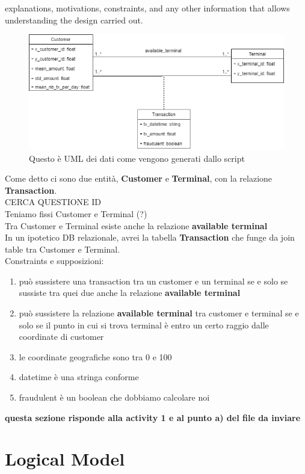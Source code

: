 \documentclass[letterpaper,11pt]{article}
\begin{document}
explanations, motivations, constraints, and any other information that allows understanding the design carried out.
\\
\begin{figure}[ht] 
        \centering \includegraphics[width=0.9\columnwidth]{images/FraudDetectionUML.png}
        \caption{\label{fig1}Questo è UML dei dati come vengono generati dallo script}
\end{figure}
Come detto ci sono due entità, \textbf{Customer} e \textbf{Terminal}, con la relazione \textbf{Transaction}.
\\
CERCA QUESTIONE ID
\\
Teniamo fissi Customer e Terminal (?)
\\
Tra Customer e Terminal esiste anche la relazione \textbf{available terminal}
\\
In un ipotetico DB relazionale, avrei la tabella \textbf{Transaction} che funge da join table tra Customer e Terminal.
\\
Constraints e supposizioni:
\begin{enumerate}
    \item può sussistere una transaction tra un customer e un terminal se e solo se sussiste tra quei due anche la relazione \textbf{available terminal}
    \item può sussistere la relazione \textbf{available terminal} tra customer e terminal se e solo se il punto in cui si trova terminal è entro un certo raggio dalle coordinate di customer
    \item le coordinate geografiche sono tra 0 e 100
    \item datetime è una stringa conforme
    \item fraudulent è un boolean che dobbiamo calcolare noi
\end{enumerate}
\textbf{questa sezione risponde alla activity 1 e al punto a) del file da inviare}

\section{Logical Model}
\end{document}
